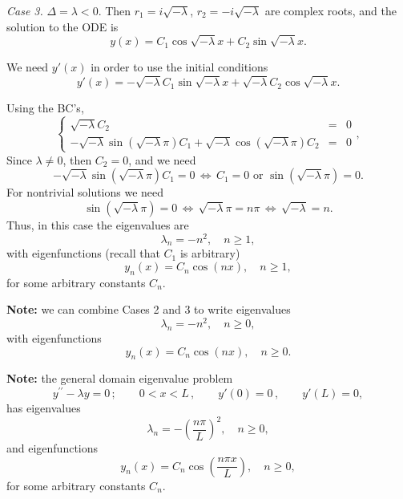 \documentclass[11pt]{article}
\begin{document}
\begin{solution}
\par \textsl{Case 3.} $\Delta = \lambda <0 .$ Then $r_{1}=i\sqrt{-\lambda}$, $r_{2}=-i\sqrt{-\lambda}$ are complex roots, and the solution to the ODE is
\[y(x)=C_{1}\cos\sqrt{-\lambda}x+C_{2}\sin\sqrt{-\lambda}x.\]

We need $y'(x)$ in order to use the initial conditions
\[y'(x)=-\sqrt{-\lambda}C_{1}\sin\sqrt{-\lambda}x+\sqrt{-\lambda}C_{2}\cos\sqrt{-\lambda}x.\]

Using the BC's,
\begin{equation*}
\left\{\begin{array}{rcl}
       \sqrt{-\lambda} C_{2}  & = & 0\\
       -\sqrt{-\lambda}\sin(\sqrt{-\lambda}\pi)C_{1} + \sqrt{-\lambda}\cos(\sqrt{-\lambda}\pi)C_{2} & = & 0
      \end{array}\right. ,
\end{equation*}
Since $\lambda\neq 0$, then $C_{2}=0$, and we need 
\[-\sqrt{-\lambda}\sin(\sqrt{-\lambda}\pi)C_{1}=0 \,\Leftrightarrow\, C_{1} = 0 \text{ or } \sin(\sqrt{-\lambda}\pi)=0.\]
For nontrivial solutions we need 
\[\sin(\sqrt{-\lambda}\pi)=0 \,\Leftrightarrow \, \sqrt{-\lambda}\pi=n\pi\,\Leftrightarrow \, \sqrt{-\lambda}=n.\] 
Thus, in this case the eigenvalues are
\[\boxed{\lambda_{n}=-n^{2}}, \quad n\geq 1,\]
with eigenfunctions (recall that $C_{1}$ is arbitrary)
\[\boxed{y_{n}(x)=C_{n}\cos(nx)}, \quad n\geq 1,\]
for some arbitrary constants $C_{n}$.

\textbf{Note:} we can combine Cases 2 and 3 to write eigenvalues
\[\boxed{\lambda_{n}=-n^{2}}, \quad n\geq 0,\]
with eigenfunctions
\[\boxed{y_{n}(x)=C_{n}\cos(nx)}, \quad n\geq 0.\]

\textbf{Note:} the general domain eigenvalue problem
\begin{equation*}
y^{\prime \prime} - \lambda y =0\,; \qquad  0<x<L \,, \qquad y'(0)=0  \,,\qquad y'(L) =0,
\end{equation*}
has eigenvalues
\[\boxed{\lambda_{n}=-\left( \frac{n\pi}{L}\right)^{2}}, \quad n\geq 0,\]
and eigenfunctions
\[\boxed{y_{n}(x)=C_{n}\cos\left( \frac{n\pi x}{L} \right)}, \quad n\geq 0,\]
for some arbitrary constants $C_{n}$.
\end{solution}
\end{document}
